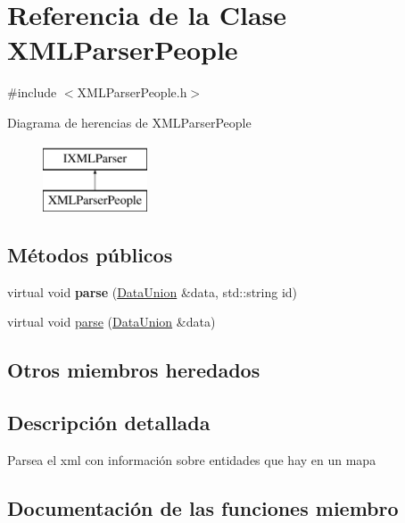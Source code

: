 \hypertarget{classXMLParserPeople}{}\section{Referencia de la Clase X\+M\+L\+Parser\+People}
\label{classXMLParserPeople}


{\ttfamily \#include $<$X\+M\+L\+Parser\+People.\+h$>$}

Diagrama de herencias de X\+M\+L\+Parser\+People\begin{figure}[H]
\begin{center}
\leavevmode
\includegraphics[height=2.000000cm]{classXMLParserPeople}
\end{center}
\end{figure}
\subsection*{Métodos públicos}
\begin{DoxyCompactItemize}
\item 
\hypertarget{classXMLParserPeople_a472645d53d8a2e477834bfffc4981abd}{}virtual void {\bfseries parse} (\hyperlink{unionDataUnion}{Data\+Union} \&data, std\+::string id)\label{classXMLParserPeople_a472645d53d8a2e477834bfffc4981abd}

\item 
virtual void \hyperlink{classXMLParserPeople_a42f23e662f772245febe910aeee07ce3}{parse} (\hyperlink{unionDataUnion}{Data\+Union} \&data)
\end{DoxyCompactItemize}
\subsection*{Otros miembros heredados}


\subsection{Descripción detallada}
Parsea el xml con información sobre entidades que hay en un mapa 

\subsection{Documentación de las funciones miembro}
\hypertarget{classXMLParserPeople_a42f23e662f772245febe910aeee07ce3}{}
